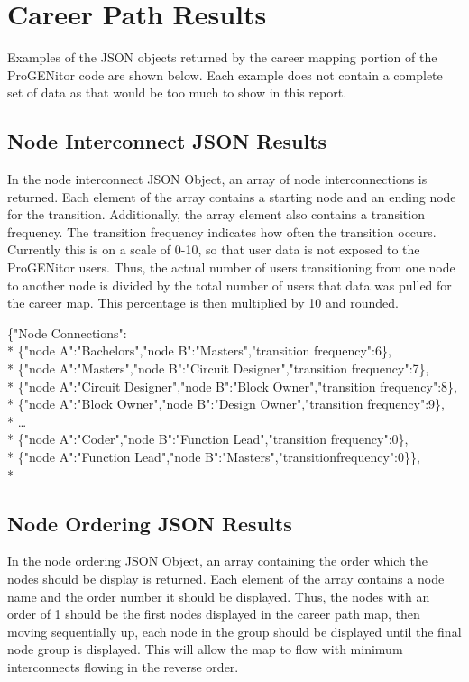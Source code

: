 \section{Career Path Results}
\label{sect:career-path-results}
Examples of the JSON objects returned by the career mapping portion of the
ProGENitor code are shown below.  Each example does not contain a complete set
of data as that would be too much to show in this report.

\subsection{Node Interconnect JSON Results}
In the node interconnect JSON Object, an array of node interconnections is
returned.  Each element of the array contains a starting node and an ending node
for the transition.  Additionally, the array element also contains a transition
frequency.  The transition frequency indicates how often the transition occurs. 
Currently this is on a scale of 0-10, so that user data is not exposed to the
ProGENitor users.  Thus, the actual number of users transitioning from one node
to another node is divided by the total number of users that data was pulled for
the career map.  This percentage is then multiplied by 10 and rounded.

\begin{tt}
\begin{footnotesize}
\noindent\{"Node Connections":\\*
\{"node A":"Bachelors","node B":"Masters","transition frequency":6\},\\*
\{"node A":"Masters","node 	B":"Circuit Designer","transition frequency":7\},\\*
\{"node A":"Circuit Designer","node B":"Block 	Owner","transition
 frequency":8\},\\* 
\{"node A":"Block Owner","node B":"Design Owner","transition frequency":9\},\\*
\ldots\\* 
\{"node A":"Coder","node B":"Function Lead","transition frequency":0\},\\*
\{"node A":"Function Lead","node B":"Masters","transitionfrequency":0\}\},\\*
\end{footnotesize}
\end{tt}


\subsection{Node Ordering JSON Results}
In the node ordering JSON Object, an array containing the order which the nodes
should be display is returned.  Each element of the array contains a node name
and the order number it should be displayed.  Thus, the nodes with an order of
1 should be the first nodes displayed in the career path map, then
moving sequentially up, each node in the group should be displayed until the
final node group is displayed.  This will allow the map to flow with minimum
interconnects flowing in the reverse order.

